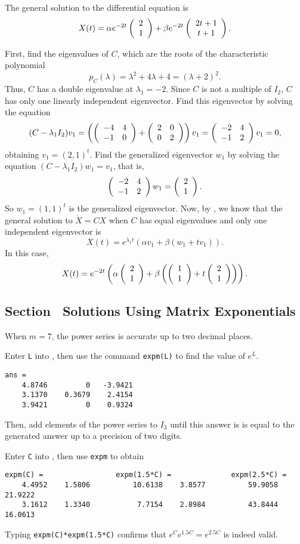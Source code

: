  \ans The general solution to the differential equation is
\[
X(t) = \alpha e^{-2t}\left(\begin{array}{c} 2 \\ 1\end{array}\right) + \beta e^{-2t}\left(\begin{array}{c} 2t + 1 \\ t + 1\end{array}\right).
\]

\soln First, find the eigenvalues of $C$, which are the roots of the
characteristic polynomial
\[
p_C(\lambda) = \lambda^2 + 4\lambda + 4 = (\lambda + 2)^2.
\]
Thus, $C$ has a double eigenvalue at $\lambda_1 = -2$.  Since $C$ is not
a multiple of $I_2$, $C$ has only one linearly independent eigenvector.
Find this eigenvector by solving the equation
\[
(C - \lambda_1I_2)v_1 = \left(\left(\begin{array}{rr} -4 & 4\\ -1 &0\end{array}\right) + \left(\begin{array}{rr} 2 & 0\\ 0 &2\end{array}\right)
\right)v_1 = \left(\begin{array}{rr} -2 & 4\\ -1 &2\end{array}\right)v_1 = 0,
\]
obtaining $v_1 = (2,1)^t$.  Find the generalized eigenvector $w_1$ by
solving the equation $(C - \lambda_1 I_2)w_1 = v_1$, that is,
\[
\left(\begin{array}{rr} -2 & 4\\ -1 &2\end{array}\right)w_1 = \left(\begin{array}{r} 2 \\ 1\end{array}\right).
\]
So $w_1 = (1,1)^t$ is the generalized eigenvector.
Now, by , we know that the
general solution to $\dot{X} = CX$ when $C$ has equal eigenvalues and only
one independent eigenvector is
\[
X(t) = e^{\lambda_1 t}(\alpha v_1 + \beta(w_1 + tv_1)).
\]
In this case,
\[
X(t) = e^{-2t}\left(\alpha \left(\begin{array}{r} 2 \\ 1\end{array}\right) + \beta\left(\left(\begin{array}{r} 1 \\ 1\end{array}\right) +
t\left(\begin{array}{r} 2 \\ 1\end{array}\right)\right)\right).
\]



\newpage
\subsection*{Section~\protect{\ref{S:Matrixexp}} Solutions Using Matrix
Exponentials}

\ans When $m = 7$, the power series is accurate up to two decimal places.

\soln Enter {\tt L} into \Matlab, then use the command {\tt expm(L)} to
find the value of $e^L$.
\begin{verbatim}
ans = 
    4.8746         0   -3.9421
    3.1370    0.3679    2.4154
    3.9421         0    0.9324
\end{verbatim}
Then, add elements of the power series to $I_3$ until this answer is
is equal to the \Matlab generated answer up to a precision of two
digits.

Enter {\tt C} into \Matlab, then use {\tt expm} to obtain
\begin{verbatim}
expm(C) =                 expm(1.5*C) =              expm(2.5*C) =
    4.4952    1.5806          10.6138    3.8577          59.9058   21.9222
    3.1612    1.3340           7.7154    2.8984          43.8444   16.0613
\end{verbatim}
Typing {\tt expm(C)*expm(1.5*C)} confirms that $e^Ce^{1.5C} =
e^{2.5C}$ is indeed valid.

